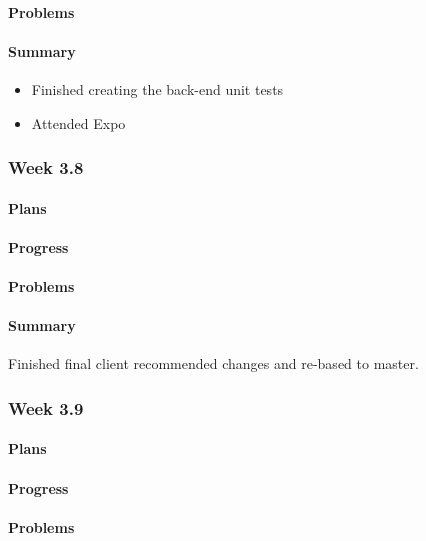 \documentclass[onecolumn, draftclsnofoot,10pt, compsoc]{article}
\begin{document}
		    \paragraph{Problems} \hfill \break

		    \paragraph{Summary} \hfill \break
		    	\begin{itemize}
                    \item Finished creating the back-end unit tests
                    \item Attended Expo
                \end{itemize}

		\subsubsection{Week 3.8}
		    \paragraph{Plans} \hfill \break
		    \paragraph{Progress} \hfill \break
		    \paragraph{Problems} \hfill \break
		    \paragraph{Summary} \hfill \break
		        Finished final client recommended changes and re-based to master.

		\subsubsection{Week 3.9}
		    \paragraph{Plans} \hfill \break
		    \paragraph{Progress} \hfill \break
		    \paragraph{Problems} \hfill \break
\end{document}
